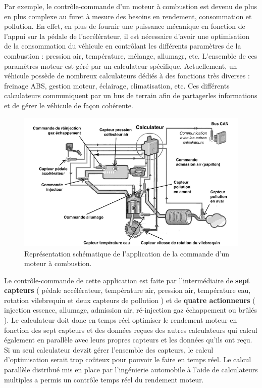 \documentclass[fleqn,11pt]{article}
\begin{document}
Par exemple, le contrôle-commande d'un moteur à combustion est devenu de plus en plus complexe au furet à mesure des besoins en rendement, consommation et pollution. En effet, en plus de fournir une puissance mécanique en fonction de l'appui sur la pédale de l'accélérateur,  il est nécessaire d'avoir une optimisation de la consommation du véhicule en contrôlant les différents paramètres de la combustion : pression air, température, mélange,  allumagr, etc. L'ensemble de ces paramètres moteur est géré par un calculateur spécifique. Actuellement,  un véhicule possède de nombreux calculateurs dédiés à des fonctions très diverses : freinage ABS, gestion moteur, éclairage,  climatisation, etc. Ces différents calculateurs communiquent par un bus de terrain afin de partagerles informations et de gérer le véhicule de façon cohérente.

\begin{figure}[h]
\includegraphics[width=\textwidth]{ControleCommande}
\caption{Représentation schématique de l'application de la commande d'un moteur à combustion.}
\end{figure}

Le contrôle-commande de cette application est faite par l'intermédiaire de \textbf{sept capteurs} ( pédale accélérateur,  température air, pression air, température eau, rotation vilebrequin et deux capteurs de pollution ) et de \textbf{quatre actionneurs} ( injection essence, allumage, admission air, ré-injection gaz échappement ou brûlés ). Le calculateur doit donc en temps réel optimiser le rendement moteur en fonction des sept capteurs et des données reçues des autres calculateurs qui calcul également en parallèle avec leurs propres capteurs et les données qu'ils ont reçu. Si un seul calculateur devzit gérer l'ensemble des capteurs, le calcul d'optimisation serait trop coûteux pour pouvoir le faire en temps réel. Le calcul parallèle distribué mis en place par l'ingénierie automobile à l'aide de calculateurs multiples a permis un contrôle temps réel du rendement moteur. 
\end{document}
